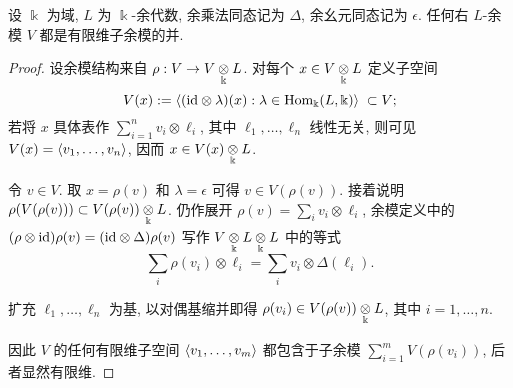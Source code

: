 \begin{lemma}\label{prop:comodule-fd-union}
	设 $\Bbbk$ 为域, $L$ 为 $\Bbbk$-余代数, 余乘法同态记为 $\Delta$, 余幺元同态记为 $\epsilon$. 任何右 $L$-余模 $V$ 都是有限维子余模的并.
\end{lemma}
\begin{proof}
	设余模结构来自 $\rho: V \to V \underset{\Bbbk}{\otimes} L$. 对每个 $x \in V \underset{\Bbbk}{\otimes} L$ 定义子空间
	\[ V(x) := \left\langle (\mathrm{id} \otimes \lambda)(x) : \lambda \in \operatorname{Hom}_{\Bbbk}(L, \Bbbk)  \right\rangle \; \subset V ; \]
	若将 $x$ 具体表作 $\sum_{i=1}^n v_i \otimes \ell_i$, 其中 $\ell_1, \ldots, \ell_n$ 线性无关, 则可见 $V(x) = \left\langle v_1, \ldots, v_n \right\rangle$, 因而 $x \in V(x) \underset{\Bbbk}{\otimes} L$.
	
	令 $v \in V$. 取 $x = \rho(v)$ 和 $\lambda = \epsilon$ 可得 $v \in V(\rho(v))$. 接着说明 $\rho(V(\rho(v))) \subset V(\rho(v)) \underset{\Bbbk}{\otimes} L$. 仍作展开 $\rho(v) = \sum_i v_i \otimes \ell_i$, 余模定义中的 $(\rho \otimes \mathrm{id})\rho(v) = (\mathrm{id} \otimes \Delta)\rho(v)$ 写作 $V \underset{\Bbbk}{\otimes} L \underset{\Bbbk}{\otimes} L$ 中的等式
	\[ \sum_i \rho(v_i) \otimes \ell_i = \sum_i v_i \otimes \Delta(\ell_i). \]
	
	扩充 $\ell_1, \ldots, \ell_n$ 为基, 以对偶基缩并即得 $\rho(v_i) \in V(\rho(v)) \underset{\Bbbk}{\otimes} L$, 其中 $i = 1, \ldots, n$.
	
	因此 $V$ 的任何有限维子空间 $\left\langle v_1, \ldots, v_m \right\rangle$ 都包含于子余模 $\sum_{i=1}^m V(\rho(v_i))$, 后者显然有限维.
\end{proof}

